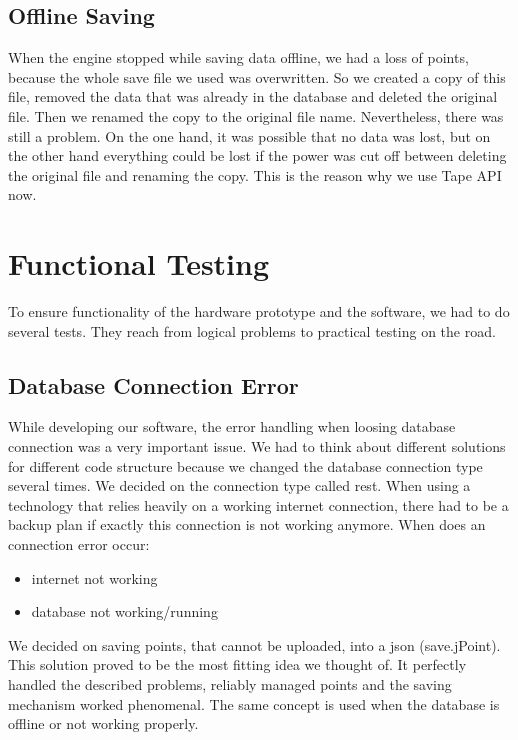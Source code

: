 \subsection{Offline Saving}
When the engine stopped while saving data offline, we had a loss of points, because the whole save file we used was overwritten. So we created a copy of this file, removed the data that was already in the database and deleted the original file. Then we renamed the copy to the original file name. Nevertheless, there was still a problem. On the one hand, it was possible that no data was lost, but on the other hand everything could be lost if the power was cut off between deleting the original file and renaming the copy. This is the reason why we use Tape API now. 
\section{Functional Testing}
To ensure functionality of the hardware prototype and the software, we had to do several tests. They reach from logical problems to practical testing on the road.
\subsection{Database Connection Error}
While developing our software, the error handling when loosing database connection was a very important issue. We had to think about different solutions for different code structure because we changed the database connection type several times. 
\newline \newline
We decided on the connection type called \gls{rest}. When using a technology that relies heavily on a working internet connection, there had to be a backup plan if exactly this connection is not working anymore.
\newline \newline
When does an connection error occur:
\begin{itemize}
\item internet not working
\item database not working/running
\end{itemize}
We decided on saving points, that cannot be uploaded, into a \gls{json} (save.jPoint). This solution proved to be the most fitting idea we thought of. It perfectly handled the described problems, reliably managed points and the saving mechanism worked phenomenal.
\newline \newline
The same concept is used when the database is offline or not working properly. 
